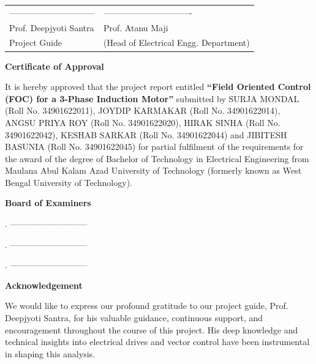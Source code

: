 \documentclass[12pt,a4paper]{report}
\begin{document}
\noindent
\begin{tabular}{@{}p{8cm}p{8cm}@{}}
------------------------------ & ------------------------------- \\
Prof. Deepjyoti Santra & Prof. Atanu Maji \\
Project Guide & (Head of Electrical Engg. Department)
\end{tabular}

\newpage
\begin{center}
{\Large \bfseries Certificate of Approval\par}
\end{center}
\vspace{1cm}
It is hereby approved that the project report entitled \textbf{``Field Oriented Control (FOC) for a 3-Phase Induction Motor''} submitted by SURJA MONDAL (Roll No. 34901622011), JOYDIP KARMAKAR (Roll No. 34901622014), ANGSU PRIYA ROY (Roll No. 34901622020), HIRAK SINHA (Roll No. 34901622042), KESHAB SARKAR (Roll No. 34901622044) and JIBITESH BASUNIA (Roll No. 34901622045) for partial fulfilment of the requirements for the award of the degree of Bachelor of Technology in Electrical Engineering from Maulana Abul Kalam Azad University of Technology (formerly known as West Bengal University of Technology).
\vspace{3cm}

\noindent \textbf{Board of Examiners}
\vspace{1.5cm}

. --------------------------- \\
\vspace{1cm}

. --------------------------- \\
\vspace{1cm}

. ---------------------------

\newpage
\begin{center}
{\Large \bfseries Acknowledgement\par}
\end{center}
\vspace{1cm}
We would like to express our profound gratitude to our project guide, Prof. Deepjyoti Santra, for his valuable guidance, continuous support, and encouragement throughout the course of this project. His deep knowledge and technical insights into electrical drives and vector control have been instrumental in shaping this analysis.
\end{document}
